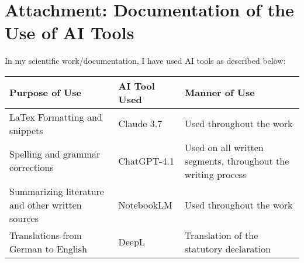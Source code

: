 \chapter*{Attachment: Documentation of the Use of AI Tools}

In my scientific work/documentation, I have used AI tools as described below:

\begin{table}[H]
\begin{tabular}{|p{}|p{}|p{}|}
\hline
\textbf{Purpose of Use} & \textbf{AI Tool Used} & \textbf{Manner of Use} \\
\hline
LaTex Formatting and snippets & Claude 3.7 & Used throughout the work  \\
\hline
Spelling and grammar corrections & ChatGPT-4.1 & Used on all written segments, throughout the writing process  \\
\hline
Summarizing literature and other written sources& NotebookLM & Used throughout the work \\
\hline
Translations from German to English & DeepL & Translation of the statutory declaration \\
\hline
\end{tabular}
\end{table}